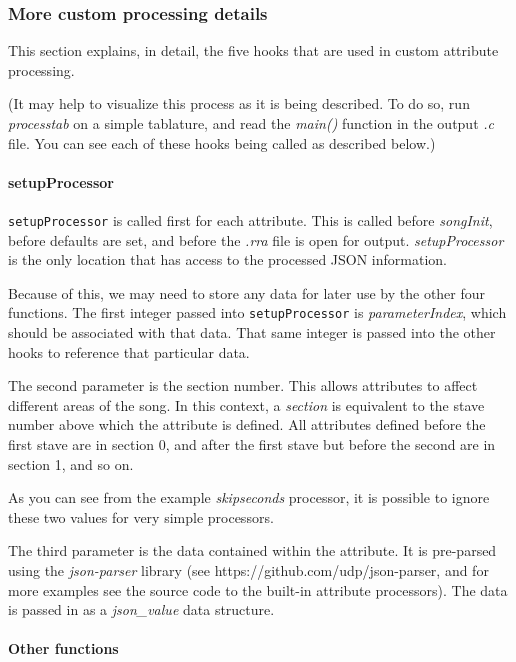 \documentclass{article}
\begin{document}
\subsubsection*{More custom processing details}

This section explains, in detail, the five hooks that are used in custom
attribute processing.

(It may help to visualize this process as it is being described.  To do so, run
{\it processtab} on a simple tablature, and read the {\it main()} function in
the output {\it .c} file.  You can see each of these hooks being called as
described below.)

\paragraph*{setupProcessor}

\verb!setupProcessor! is called first for each attribute.  This is called before
{\it songInit}, before defaults are set, and before the {\it .rra} file is open
for output.  {\it setupProcessor} is the only location that has access to the
processed JSON information.

Because of this, we may need to store any data for later use by the other four
functions.  The first integer passed into \verb!setupProcessor! is {\it
parameterIndex}, which should be associated with that data.  That same integer
is passed into the other hooks to reference that particular data.

The second parameter is the section number.  This allows attributes to affect
different areas of the song.  In this context, a {\it section} is equivalent to
the stave number above which the attribute is defined.  All attributes defined
before the first stave are in section 0, and after the first stave but before
the second are in section 1, and so on.

As you can see from the example {\it skipseconds} processor, it is possible to
ignore these two values for very simple processors.

The third parameter is the data contained within the attribute.  It is
pre-parsed using the {\it json-parser} library (see
https://github.com/udp/json-parser, and for more examples see the source code
to the built-in attribute processors).  The data is passed in as a {\it
json\_value} data structure.

\paragraph*{Other functions}
\end{document}
